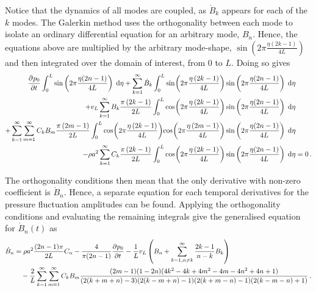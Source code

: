 Notice that the dynamics of all modes are coupled, as $\dot{B}_k$ appears for each of the $k$ modes. The Galerkin method uses the orthogonality between each mode to isolate an ordinary differential equation for an arbitrary mode, $B_n$. Hence, the equations above are multiplied by the arbitrary mode-shape, $\sin\left(2\pi\frac{\eta(2k-1)}{4L}\right)$ and then integrated over the domain of interest, from $0$ to $L$. Doing so gives
~
\begin{equation*}
\begin{split}
    \pdiff{p_0}{t} \int^L_0 \sin\left(2\pi\frac{\eta(2n-1)}{4L}\right) \Idx{\eta}
    + \sum_{k=1}^{\infty} \dot{B}_k \int^L_0 \fun{sin}{2\pi \frac{\eta \left( 2 k - 1 \right)}{4L}} \sin\left(2\pi\frac{\eta(2n-1)}{4L}\right) \Idx{\eta}
    & \\ %
    + v_L \sum_{k=1}^{\infty} B_k \frac{\pi \left( 2 k - 1 \right)}{2L} \int^L_0 \fun{cos}{2\pi \frac{\eta \left( 2 k - 1 \right)}{4L}} \sin\left(2\pi\frac{\eta(2n-1)}{4L}\right) \Idx{\eta}
    & \\ %
    + \sum_{k=1}^{\infty} \sum_{m=1}^{\infty} C_k B_m \frac{\pi \left( 2 m - 1 \right)}{2L} \int^L_0 \fun{cos}{2\pi \frac{\eta \left( 2 k - 1 \right)}{4L}} \fun{cos}{2\pi \frac{\eta \left( 2 m - 1 \right)}{4L}} \sin\left(2\pi\frac{\eta(2n-1)}{4L}\right) \Idx{\eta}
    & \\ %
    - \rho a^2 \sum_{k=1}^{\infty} C_k \frac{\pi \left( 2 k - 1 \right)}{2L} \int^L_0 \fun{cos}{2\pi \frac{\eta \left( 2 k - 1 \right)}{4L}} \sin\left(2\pi\frac{\eta(2n-1)}{4L}\right) \Idx{\eta}
    &= 0 \, .
\end{split}
\end{equation*}

The orthogonality conditions then mean that the only derivative with non-zero coefficient is $\dot{B}_n$. Hence, a separate equation for each temporal derivatives for the pressure fluctuation amplitudes can be found. Applying the orthogonality conditions and evaluating the remaining integrals give the generalised equation for $\dot{B}_n(t)$ as
~
\begin{equation*}
\begin{split}
    \dot{B}_n &=
    \rho a^2 \frac{(2n-1)\pi}{2L} C_n
    - \frac{4}{\pi(2n-1)} \pdiff{p_0}{t}
    - \frac{1}{L} v_L \left( B_n + \sum^{\infty}_{k = 1,n \neq k} \frac{2k-1}{n-k} B_k \right)
    \\ & \quad
    - \frac{2}{L} \sum^{\infty}_{k=1} \sum^{\infty}_{m=1} C_k B_m \frac{
    (2m-1)(1-2n)(4k^2 - 4k + 4m^2 - 4m - 4n^2 + 4n + 1)
    }{
    (2(k+m+n)-3)(2(k-m+n)-1)(2(k+m-n)-1)(2(k-m-n)+1)
    } \, .
\end{split}
\end{equation*}

